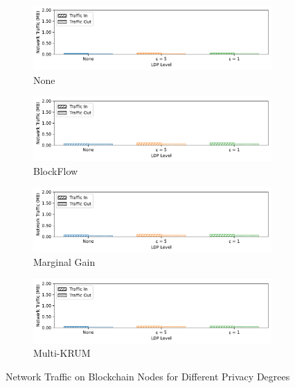 \begin{figure}[!ht]
    \centering
    \begin{subfigure}[b]{0.49\textwidth}
        \centering
        \includegraphics[width=\textwidth]{graphics/05_priv_net_none_miner.pdf}
        \caption{None}
    \end{subfigure}
    \hfill
    \begin{subfigure}[b]{0.49\textwidth}
        \centering
        \includegraphics[width=\textwidth]{graphics/05_priv_net_blockflow_miner.pdf}
        \caption{BlockFlow}
    \end{subfigure}
    \hfill
    \begin{subfigure}[b]{0.49\textwidth}
        \centering
        \includegraphics[width=\textwidth]{graphics/05_priv_net_marginalgain_miner.pdf}
        \caption{Marginal Gain}
    \end{subfigure}
    \hfill
    \begin{subfigure}[b]{0.49\textwidth}
        \centering
        \includegraphics[width=\textwidth]{graphics/05_priv_net_multikrum_miner.pdf}
        \caption{Multi-KRUM}
    \end{subfigure}
    \caption{Network Traffic on Blockchain Nodes for Different Privacy Degrees}
    \label{fig:net_priv_degree_miner}
\end{figure}

